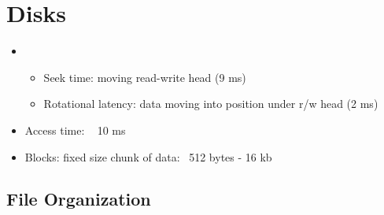 \documentclass[12pt]{article}
\begin{document}
	\section*{Disks}
		\begin{itemize}
			\item
				\begin{itemize}
				\item	
					Seek time: moving read-write head (9 ms)
				\item
					Rotational latency: data moving into position under r/w head (2 ms)
				\end{itemize}
			\item
				Access time: ~ 10 ms
			\item
				Blocks: fixed size chunk of data: ~512 bytes - 16 kb
		\end{itemize}
		\subsection*{File Organization}
\end{document}
